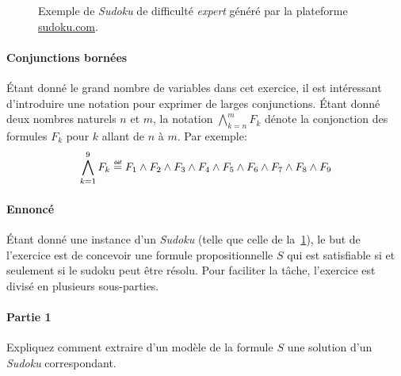 \documentclass[12pt,french,a4paper]{article}
\newcommand\eqdef{\mathrel{\overset{\makebox[0pt]{\mbox{\normalfont\tiny\sffamily déf}}}{=}}}
\begin{document}
\begin{question}
\vspace{1cm}

\begin{figure}[h]

\begin{center}
  \begin{lpsudoku}
  \end{lpsudoku}
\end{center}

\caption{Exemple de \textit{Sudoku} de difficulté \textit{expert} généré par la plateforme \url{sudoku.com}.}
\label{fig_sudoku}

\end{figure}

\newpage

\paragraph{Conjunctions bornées} Étant donné le grand nombre de variables dans cet exercice, il est intéressant d'introduire une notation pour exprimer de larges conjunctions. Étant donné deux nombres naturels $n$ et $m$, la notation $\bigwedge_{k=n}^m F_k$ dénote la conjonction des formules $F_k$ pour $k$ allant de $n$ à $m$. Par exemple:
\[
\bigwedge_{k=1}^9 F_k \eqdef F_1 \wedge F_2 \wedge F_3 \wedge F_4 \wedge F_5 \wedge F_6 \wedge F_7 \wedge F_8 \wedge F_9
\]

\vspace{1cm}

\paragraph{Ennoncé}

Étant donné une instance d'un \textit{Sudoku} (telle que celle de la~\cref{fig_sudoku}), le but de l'exercice est de concevoir une formule propositionnelle $S$ qui est satisfiable si et seulement si le sudoku peut être résolu.
Pour faciliter la tâche, l'exercice est divisé en plusieurs sous-parties.

\paragraph{Partie 1}
Expliquez comment extraire d'un modèle de la formule $S$ une solution d'un \textit{Sudoku} correspondant.


\end{question}
\end{document}
